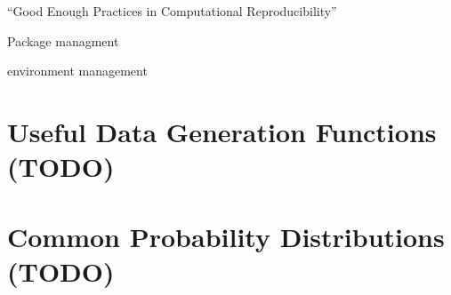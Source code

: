 \documentclass[
]{krantz}
\begin{document}
``Good Enough Practices in Computational Reproducibility'' \citep{wilson_bryan_cranston_kitzes_nederbragt_teal_2017}

Package managment \citep{R-renv}

environment management

\cleardoublepage

\hypertarget{appendix-appendix}{%
\appendix {}}


\hypertarget{useful-data-generation-functions-todo}{%
\chapter{Useful Data Generation Functions (TODO)}\label{useful-data-generation-functions-todo}}

\hypertarget{common-probability-distributions-todo}{%
\chapter{Common Probability Distributions (TODO)}\label{common-probability-distributions-todo}}

  

\backmatter
\printindex
\end{document}
